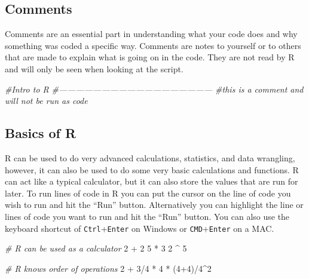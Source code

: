 \documentclass[]{article}
\newenvironment{Shaded}{\begin{snugshade}}{\end{snugshade}}
\newcommand{\DecValTok}[1]{\textcolor[rgb]{0.00,0.00,0.81}{{#1}}}
\newcommand{\StringTok}[1]{\textcolor[rgb]{0.31,0.60,0.02}{{#1}}}
\newcommand{\CommentTok}[1]{\textcolor[rgb]{0.56,0.35,0.01}{\textit{{#1}}}}
\newcommand{\NormalTok}[1]{{#1}}
\begin{document}
\subsection{Comments}\label{comments}

Comments are an essential part in understanding what your code does and
why something was coded a specific way. Comments are notes to yourself
or to others that are made to explain what is going on in the code. They
are not read by R and will only be seen when looking at the script.

\begin{Shaded}
\begin{Highlighting}[]
\CommentTok{#Intro to R}
\CommentTok{#------------------------------------------------------}
\CommentTok{#this is a comment and will not be run as code}
\end{Highlighting}
\end{Shaded}

\subsection{Basics of R}\label{basics-of-r}

R can be used to do very advanced calculations, statistics, and data
wrangling, however, it can also be used to do some very basic
calculations and functions. R can act like a typical calculator, but it
can also store the values that are run for later. To run lines of code
in R you can put the cursor on the line of code you wish to run and hit
the ``Run'' button. Alternatively you can highlight the line or lines of
code you want to run and hit the ``Run'' button. You can also use the
keyboard shortcut of \texttt{Ctrl}+\texttt{Enter} on Windows or
\texttt{CMD}+\texttt{Enter} on a MAC.

\begin{Shaded}
\begin{Highlighting}[]
\CommentTok{# R can be used as a calculator}
\DecValTok{2} \NormalTok{+}\StringTok{ }\DecValTok{2}
\DecValTok{5} \NormalTok{*}\StringTok{ }\DecValTok{3}
\DecValTok{2} \NormalTok{^}\StringTok{ }\DecValTok{5}

\CommentTok{# R knows order of operations}
\DecValTok{2} \NormalTok{+}\StringTok{ }\DecValTok{3}\NormalTok{/}\DecValTok{4} \NormalTok{*}\StringTok{ }\DecValTok{4} \NormalTok{*}\StringTok{ }\NormalTok{(}\DecValTok{4+4}\NormalTok{)/}\DecValTok{4}\NormalTok{^}\DecValTok{2}
\end{Highlighting}
\end{Shaded}
\end{document}
